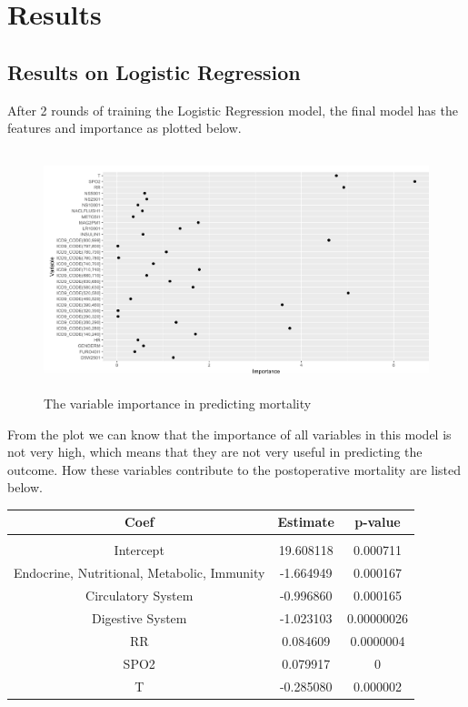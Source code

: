 \documentclass[twoside,11pt]{article}
\begin{document}
\section{Results} \label{results}

\subsection{Results on Logistic Regression} 
After 2 rounds of training the Logistic Regression model, the final model has the features and importance as plotted below.

\begin{figure}[htbp]
  \centering 
  \includegraphics[height=7cm, width=14cm]{fig5} 
  \caption{The variable importance in predicting mortality}
  \label{fig5} 
\end{figure} 

From the plot we can know that the importance of all variables in this model is not very high, which means that they are not very useful in predicting the outcome. How these variables contribute to the postoperative mortality are listed below.

\begin{table}[htbp]
  \centering 
  \begin{tabular}{|c|c|c|} 
     Coef & Estimate & p-value\\ 
    \hline \\[-11pt]
    Intercept & 19.608118 & 0.000711\\ 
    Endocrine, Nutritional, Metabolic, Immunity & -1.664949 & 0.000167\\ 
    Circulatory System & -0.996860 & 0.000165\\
    Digestive System & -1.023103 & 0.00000026\\
    RR & 0.084609 & 0.0000004\\ 
    SPO2 & 0.079917 & 0\\
    T & -0.285080 & 0.000002\\ \hline 
  \end{tabular}
\end{table}
\end{document}
